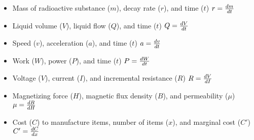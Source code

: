 
\begin{itemize}
\item{} Mass of radioactive substance ($m$), decay rate ($r$), and time ($t$) \hskip 30pt $r = {dm \over dt}$
\vskip 10pt 
\item{} Liquid volume ($V$), liquid flow ($Q$), and time ($t$) \hskip 30pt $Q = {dV \over dt}$
\vskip 10pt 
\item{} Speed ($v$), acceleration ($a$), and time ($t$) \hskip 30pt $a = {dv \over dt}$
\vskip 10pt 
\item{} Work ($W$), power ($P$), and time ($t$) \hskip 30pt $P = {dW \over dt}$
\vskip 10pt 
\item{} Voltage ($V$), current ($I$), and incremental resistance ($R$) \hskip 30pt $R = {dV \over dI}$
\vskip 10pt 
\item{} Magnetizing force ($H$), magnetic flux density ($B$), and permeability ($\mu$) \hskip 30pt $\mu = {dB \over dH}$
\vskip 10pt 
\item{} Cost ($C$) to manufacture items, number of items ($x$), and marginal cost ($C'$) \hskip 30pt $C' = {dC \over dx}$
\end{itemize}













